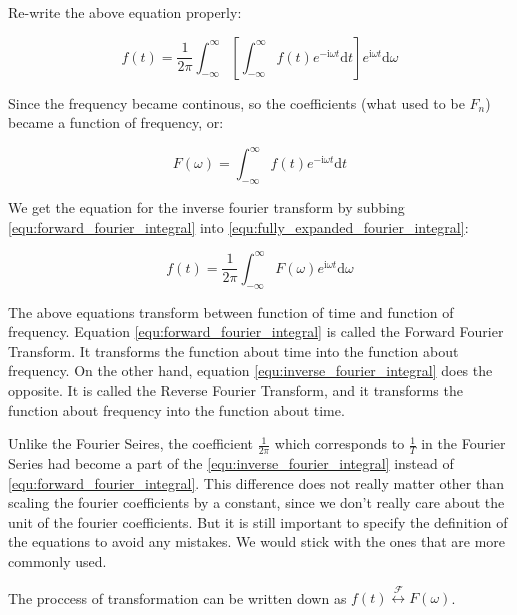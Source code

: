 \documentclass[12pt]{article}
\begin{document}
Re-write the above equation properly:

\begin{equation}
    f(t) 
    = \frac{1}{2\pi} \int_{-\infty}^{\infty} \left[ 
    \int_{-\infty}^{\infty} f(t) e^{-\mathrm{i}\omega t} \mathrm{d}t \right] e^{\mathrm{i}\omega t} \mathrm{d}\omega
    \label{equ:fully_expanded_fourier_integral}
\end{equation}

\indent Since the frequency became continous, so the coefficients (what used to be $F_n$) 
became a function of frequency, or:

\begin{equation}
    F(\omega) = \int_{-\infty}^{\infty} f(t) e^{-\mathrm{i}\omega t} \mathrm{d}t
    \label{equ:forward_fourier_integral}
\end{equation}

\indent We get the equation for the inverse fourier transform by subbing 
{\eqref{equ:forward_fourier_integral}} into {\eqref{equ:fully_expanded_fourier_integral}}:

\begin{equation}
    f(t) = \frac{1}{2\pi} \int_{-\infty}^{\infty} F(\omega) e^{\mathrm{i}\omega t} \mathrm{d}\omega
    \label{equ:inverse_fourier_integral}
\end{equation}

\indent The above equations transform between function of time and function of frequency. 
Equation {\eqref{equ:forward_fourier_integral}} is called the Forward Fourier Transform. 
It transforms the function about time into the function about frequency. On the other hand, 
equation {\eqref{equ:inverse_fourier_integral}} does the opposite. It is called the Reverse Fourier Transform, 
and it transforms the function about frequency into the function about time. 

\indent Unlike the Fourier Seires, the coefficient $\frac{1}{2\pi}$ which corresponds 
to $\frac{1}{T}$ in the Fourier Series had become a part of the {\eqref{equ:inverse_fourier_integral}} instead of 
{\eqref{equ:forward_fourier_integral}}. 
This difference does not really matter other than scaling the fourier coefficients by a constant, 
since we don't really care about the unit of the fourier coefficients. 
But it is still important to specify the definition of the equations to avoid any mistakes. 
We would stick with the ones that are more commonly used.

\indent The proccess of transformation can be written down as 
$f(t) \stackrel{\mathcal{F}}{\longleftrightarrow} F(\omega)$.
\end{document}

